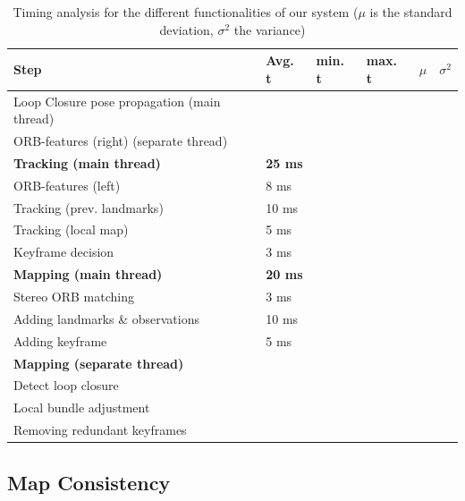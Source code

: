 \documentclass[a4paper, 10pt]{article}
\begin{document}
\begin{table}[htbp]
\caption{\label{tab:org95e55f7}
Timing analysis for the different functionalities of our system (\(\mu\) is the standard deviation, \(\sigma^{\text{2}}\) the variance)}
\centering
\begin{tabular}{llllll}
Step & Avg. t & min. t & max. t & \(\mu\) & \(\sigma^{\text{2}}\)\\
\hline
\hline
Loop Closure pose propagation (main thread) &  &  &  &  & \\
\hline
ORB-features (right) (separate thread) &  &  &  &  & \\
\hline
\textbf{Tracking (main thread)} & \textbf{25 ms} &  &  &  & \\
ORB-features (left) & 8 ms &  &  &  & \\
Tracking (prev. landmarks) & 10 ms &  &  &  & \\
Tracking (local map) & 5 ms &  &  &  & \\
Keyframe decision & 3 ms &  &  &  & \\
\hline
\textbf{Mapping (main thread)} & \textbf{20 ms} &  &  &  & \\
Stereo ORB matching & 3 ms &  &  &  & \\
Adding landmarks \& observations & 10 ms &  &  &  & \\
Adding keyframe & 5 ms &  &  &  & \\
\hline
\textbf{Mapping (separate thread)} &  &  &  &  & \\
Detect loop closure &  &  &  &  & \\
Local bundle adjustment &  &  &  &  & \\
Removing redundant keyframes &  &  &  &  & \\
\end{tabular}
\end{table}

\subsection{Map Consistency}
\label{sec:org9f20786}
\end{document}
